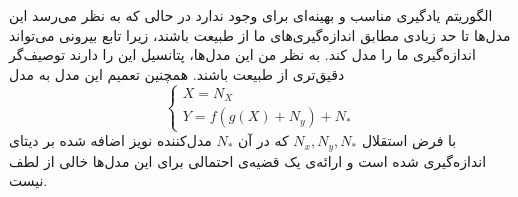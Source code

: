 \documentclass[a4paper,12pt]{article}
\begin{document}
الگوریتم یادگیری مناسب و بهینه‌ای برای 
 وجود ندارد در حالی که به نظر می‌رسد این مدل‌ها تا حد زیادی مطابق اندازه‌گیری‌های ما از طبیعت باشند، زیرا تابع بیرونی می‌تواند اندازه‌گیری ما را مدل کند. به نظر من این مدل‌ها، پتانسیل این را دارند توصیف‌گر دقیق‌تری از طبیعت باشند. همچنین تعمیم این مدل به مدل
 \begin{equation*}
\begin{cases}
X = N_X\\
Y = f(g(X) + N_y) + N_*
\end{cases}
 \end{equation*}
 با فرض استقلال
$ N_x, N_y, N_*$
 که در آن $N_*$ مدل‌کننده نویز اضافه شده بر دیتای اندازه‌گیری شده است و ارائه‌ی یک قضیه‌ی
 احتمالی  برای این مدل‌ها خالی از لطف نیست.


\end{document}
